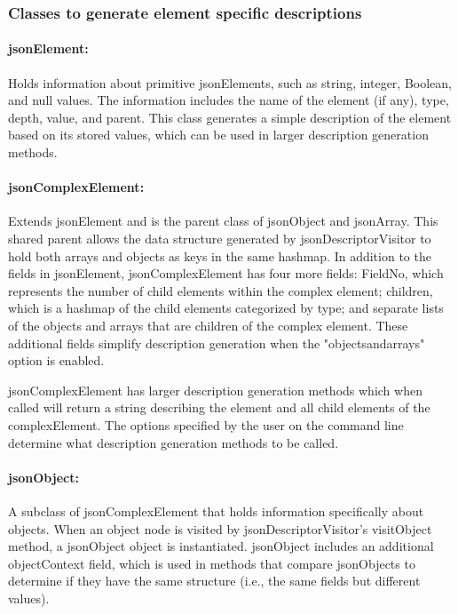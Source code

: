 \documentclass{l4proj}
\begin{document}
\subsubsection{Classes to generate element specific descriptions} \hfill 

\paragraph{\textbf{jsonElement}:} Holds information about primitive jsonElements, such as string, integer, Boolean, and null values. The information includes the name of the element (if any), type, depth, value, and parent. This class generates a simple description of the element based on its stored values, which can be used in larger description generation methods.

\paragraph{\textbf{jsonComplexElement}:} Extends jsonElement and is the parent class of jsonObject and jsonArray. This shared parent allows the data structure generated by jsonDescriptorVisitor to hold both arrays and objects as keys in the same hashmap. In addition to the fields in jsonElement, jsonComplexElement has four more fields: FieldNo, which represents the number of child elements within the complex element; children, which is a hashmap of the child elements categorized by type; and separate lists of the objects and arrays that are children of the complex element. These additional fields simplify description generation when the "objectsandarrays" option is enabled.

jsonComplexElement has larger description generation methods which when called will return a string describing the element and all child elements of the complexElement. The options specified by the user on the command line determine what description generation methods to be called.

\paragraph{\textbf{jsonObject}:} A subclass of jsonComplexElement that holds information specifically about objects. When an object node is visited by jsonDescriptorVisitor's visitObject method, a jsonObject object is instantiated. jsonObject includes an additional objectContext field, which is used in methods that compare jsonObjects to determine if they have the same structure (i.e., the same fields but different values).
\end{document}

